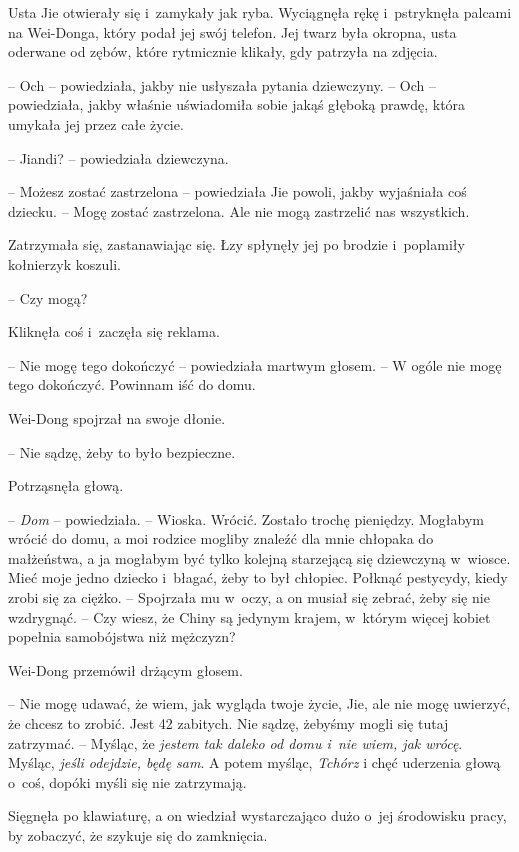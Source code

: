 \documentclass[oneside,polish,11pt,rmheadings]{mwbk}
\begin{document}
Usta Jie otwierały się i~zamykały jak ryba. Wyciągnęła rękę i~pstryknęła palcami na Wei-Donga, który podał jej swój telefon. Jej twarz była okropna, usta oderwane od zębów, które rytmicznie klikały, gdy patrzyła na zdjęcia.

-- Och -- powiedziała, jakby nie usłyszała pytania dziewczyny. -- Och -- powiedziała, jakby właśnie uświadomiła sobie jakąś głęboką prawdę, która umykała jej przez całe życie.

-- Jiandi? -- powiedziała dziewczyna.

-- Możesz zostać zastrzelona -- powiedziała Jie powoli, jakby wyjaśniała coś dziecku. -- Mogę zostać zastrzelona. Ale nie mogą zastrzelić nas wszystkich.

Zatrzymała się, zastanawiając się. Łzy spłynęły jej po brodzie i~poplamiły kołnierzyk koszuli.

-- Czy mogą? 

Kliknęła coś i~zaczęła się reklama.

-- Nie mogę tego dokończyć -- powiedziała martwym głosem. -- W ogóle nie mogę tego dokończyć. Powinnam iść do domu.

Wei-Dong spojrzał na swoje dłonie. 

-- Nie sądzę, żeby to było bezpieczne.

Potrząsnęła głową. 

-- \textit{Dom }-- powiedziała. -- Wioska. Wrócić. Zostało trochę pieniędzy. Mogłabym wrócić do domu, a moi rodzice mogliby znaleźć dla mnie chłopaka do małżeństwa, a ja mogłabym być tylko kolejną starzejącą się dziewczyną w~wiosce. Mieć moje jedno dziecko i~błagać, żeby to był chłopiec. Połknąć pestycydy, kiedy zrobi się za ciężko. -- Spojrzała mu w~oczy, a on musiał się zebrać, żeby się nie wzdrygnąć. -- Czy wiesz, że Chiny są jedynym krajem, w~którym więcej kobiet popełnia samobójstwa niż mężczyzn?

Wei-Dong przemówił drżącym głosem. 

-- Nie mogę udawać, że wiem, jak wygląda twoje życie, Jie, ale nie mogę uwierzyć, że chcesz to zrobić. Jest 42 zabitych. Nie sądzę, żebyśmy mogli się tutaj zatrzymać. -- Myśląc, że \textit{jestem tak daleko od domu i~nie wiem, jak wrócę}. Myśląc, \textit{jeśli odejdzie, będę sam}. A potem myśląc, \textit{Tchórz }i chęć uderzenia głową o~coś, dopóki myśli się nie zatrzymają.

Sięgnęła po klawiaturę, a on wiedział wystarczająco dużo o~jej środowisku pracy, by zobaczyć, że szykuje się do zamknięcia.
\end{document}
